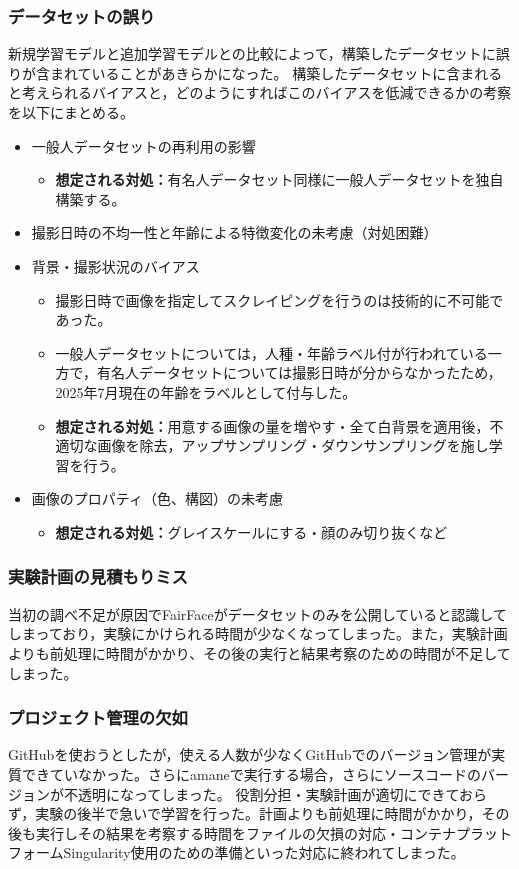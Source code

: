 \documentclass[a4paper,11pt,titlepage]{jsarticle}
\begin{document}
\subsubsection*{データセットの誤り}
新規学習モデルと追加学習モデルとの比較によって，構築したデータセットに誤りが含まれていることがあきらかになった。
構築したデータセットに含まれると考えられるバイアスと，どのようにすればこのバイアスを低減できるかの考察を以下にまとめる。
\begin{itemize}
	\item 一般人データセットの再利用の影響
		\begin{itemize}
			\item \textbf{想定される対処：}有名人データセット同様に一般人データセットを独自構築する。
		\end{itemize}
	\item  撮影日時の不均一性と年齢による特徴変化の未考慮（対処困難）
	\item 背景・撮影状況のバイアス
		\begin{itemize}
			\item 撮影日時で画像を指定してスクレイピングを行うのは技術的に不可能であった。
			\item 一般人データセットについては，人種・年齢ラベル付が行われている一方で，有名人データセットについては撮影日時が分からなかったため，2025年7月現在の年齢をラベルとして付与した。
			\item \textbf{想定される対処：}用意する画像の量を増やす・全て白背景を適用後，不適切な画像を除去，アップサンプリング・ダウンサンプリングを施し学習を行う。
		\end{itemize}
	\item 画像のプロパティ（色、構図）の未考慮
		\begin{itemize}
			\item \textbf{想定される対処：}グレイスケールにする・顔のみ切り抜くなど
		\end{itemize}
\end{itemize}

\subsubsection*{実験計画の見積もりミス}
当初の調べ不足が原因でFairFaceがデータセットのみを公開していると認識してしまっており，実験にかけられる時間が少なくなってしまった。また，実験計画よりも前処理に時間がかかり、その後の実行と結果考察のための時間が不足してしまった。

\subsubsection*{プロジェクト管理の欠如}
GitHubを使おうとしたが，使える人数が少なくGitHubでのバージョン管理が実質できていなかった。さらにamaneで実行する場合，さらにソースコードのバージョンが不透明になってしまった。
役割分担・実験計画が適切にできておらず，実験の後半で急いで学習を行った。計画よりも前処理に時間がかかり，その後も実行しその結果を考察する時間をファイルの欠損の対応・コンテナプラットフォームSingularity使用のための準備といった対応に終われてしまった。
\end{document}
